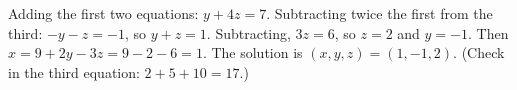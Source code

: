 Adding the first two equations: $y+4z=7$. Subtracting twice the first from the third: $-y-z=-1$, so $y+z=1$. Subtracting, $3z=6$, so $z=2$ and $y=-1$. Then $x=9+2y-3z=9-2-6=1$. The solution is $\boxed{(x,y,z)=(1,-1,2)}$. (Check in the third equation: $2+5+10=17$.)
